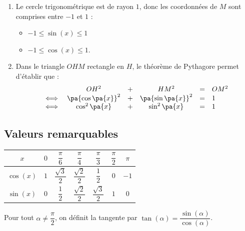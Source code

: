 \begin{demo}
	\nline
	\begin{enumerate}
		\item Le cercle trigonométrique est de rayon $1$, donc les coordonnées de $M$ sont comprises entre $-1$ et $1$ :
		      \begin{itemize}
			      \item $-1 \leqslant \sin(x) \leqslant 1$
			      \item $-1 \leqslant \cos(x) \leqslant 1$.
		      \end{itemize}
		\item Dans le triangle $OHM$ rectangle en $H$, le théorème de Pythagore permet d'établir que :
		      \[
			      \begin{array}{rccccl}
				           & OH^2              & + & HM^2              & = & OM^2 \\
				      \iff & \pa{\cos\pa{x}}^2 & + & \pa{\sin\pa{x}}^2 & = & 1    \\
				      \iff & \cos^2 \pa{x}     & + & \sin^2 \pa{x}     & = & 1
			      \end{array}
		      \]
	\end{enumerate}
\end{demo}

\subsection{Valeurs remarquables}

\begin{prop}
	\nline
	\begin{center}
		\begin{tabular}{|c|c|c|c|c|c|c|} \hline
			\rule[-4mm]{0mm}{11mm}\ccg $x$       & $0$ & $\dfrac{\pi}{6}$      & $\dfrac{\pi}{4}$      & $\dfrac{\pi}{3}$      & $\dfrac{\pi}{2}$ & $\pi$ \\ \hline
			\rule[-4mm]{0mm}{11mm}\ccg $\cos(x)$ & $1$ & $\dfrac{\sqrt{3}}{2}$ & $\dfrac{\sqrt{2}}{2}$ & $\dfrac{1}{2}$        & $0$              & $-1$  \\ \hline
			\rule[-4mm]{0mm}{11mm}\ccg $\sin(x)$ & $0$ & $\dfrac{1}{2}$        & $\dfrac{\sqrt{2}}{2}$ & $\dfrac{\sqrt{3}}{2}$ & $1$              & $0$   \\ \hline
		\end{tabular}
	\end{center}
\end{prop}

\begin{rem}
	Pour tout $\alpha \neq \dfrac{\pi}{2}$, on définit la tangente par $\tan(\alpha) = \dfrac{\sin(\alpha)}{\cos(\alpha)}$.
\end{rem}


